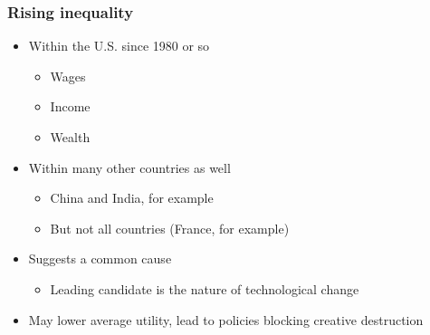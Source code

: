 \documentclass[serif,professionalfont,red,aspectratio=169]{beamer}
\begin{document}
\begin{frame}[t]
\frametitle{Rising inequality}
\vspace{2mm}
\begin{itemize}
\item Within the U.S. since 1980 or so
\begin{itemize}
\vspace{2mm}
\item Wages
\vspace{2mm}
\item Income
\vspace{2mm}
\item Wealth
\end{itemize}
\vspace{4mm}
\item Within many other countries as well
\begin{itemize}
\vspace{2mm}
\item China and India, for example
\vspace{2mm}
\item But not all countries (France, for example)
\end{itemize}
\vspace{4mm}
\item Suggests a common cause
\begin{itemize}
\vspace{2mm}
\item Leading candidate is the nature of technological change
\end{itemize}
\vspace{4mm}
\item May lower average utility, lead to policies blocking creative destruction
\end{itemize}
\end{frame}
\end{document}
